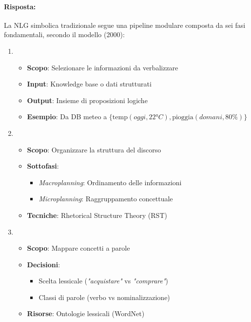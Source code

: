 
\paragraph{Risposta:} La NLG simbolica tradizionale segue una pipeline modulare composta da sei fasi fondamentali, secondo il modello  (2000):

\begin{enumerate}
\item {}
\begin{itemize}
    \item \textbf{Scopo}: Selezionare le informazioni da verbalizzare
    \item \textbf{Input}: Knowledge base o dati strutturati
    \item \textbf{Output}: Insieme di proposizioni logiche
    \item \textbf{Esempio}: Da DB meteo a $\{\text{temp}(oggi, 22°C), \text{pioggia}(domani, 80\%)\}$
\end{itemize}

\item {}
\begin{itemize}
    \item \textbf{Scopo}: Organizzare la struttura del discorso
    \item \textbf{Sottofasi}:
    \begin{itemize}
        \item \textit{Macroplanning}: Ordinamento delle informazioni
        \item \textit{Microplanning}: Raggruppamento concettuale
    \end{itemize}
    \item \textbf{Tecniche}: Rhetorical Structure Theory (RST)
\end{itemize}

\item {}
\begin{itemize}
    \item \textbf{Scopo}: Mappare concetti a parole
    \item \textbf{Decisioni}:
    \begin{itemize}
        \item Scelta lessicale (\textit{"acquistare"} vs \textit{"comprare"})
        \item Classi di parole (verbo vs nominalizzazione)
    \end{itemize}
    \item \textbf{Risorse}: Ontologie lessicali (WordNet)
\end{itemize}


\end{enumerate}
